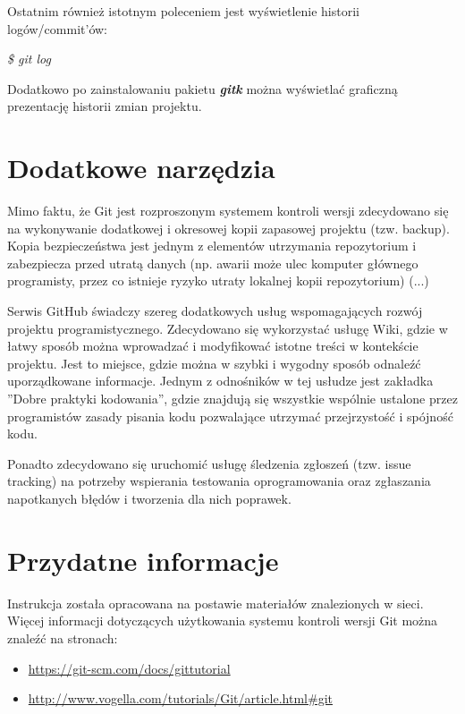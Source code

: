 Ostatnim również istotnym poleceniem jest wyświetlenie historii logów/commit'ów:
\begin{center}\textit{\$ git log}\end{center}

Dodatkowo po zainstalowaniu pakietu \textit{\textbf{gitk}} można wyświetlać graficzną prezentację historii zmian projektu.

\section{Dodatkowe narzędzia}
	Mimo faktu, że Git jest rozproszonym systemem kontroli wersji zdecydowano się na wykonywanie dodatkowej i okresowej kopii zapasowej projektu (tzw. backup). Kopia bezpieczeństwa jest jednym z elementów utrzymania repozytorium i zabezpiecza przed utratą danych (np. awarii może ulec komputer głównego programisty, przez co istnieje ryzyko utraty lokalnej kopii repozytorium) (...)

Serwis GitHub świadczy szereg dodatkowych usług wspomagających rozwój projektu programistycznego. Zdecydowano się wykorzystać usługę Wiki, gdzie w łatwy sposób można wprowadzać i modyfikować istotne treści w kontekście projektu. Jest to miejsce, gdzie można w szybki i wygodny sposób odnaleźć uporządkowane informacje. Jednym z odnośników w tej usłudze jest zakładka ''Dobre praktyki kodowania'', gdzie znajdują się wszystkie wspólnie ustalone przez programistów zasady pisania kodu pozwalające utrzymać przejrzystość i spójność kodu.

	Ponadto zdecydowano się uruchomić usługę śledzenia zgłoszeń (tzw. issue tracking) na potrzeby wspierania testowania oprogramowania oraz zgłaszania napotkanych błędów i tworzenia dla nich poprawek.

\section{Przydatne informacje}
Instrukcja została opracowana na postawie materiałów znalezionych w sieci. Więcej informacji dotyczących użytkowania systemu kontroli wersji Git można znaleźć na stronach:
\begin{itemize}
\item \url{https://git-scm.com/docs/gittutorial}
\item \url{http://www.vogella.com/tutorials/Git/article.html\#git}
\end{itemize}